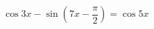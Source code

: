 \begin{ex}[type=equation]
	\begin{condition}
		$\ \cos 3x-\sin {\left(7x -\dfrac{\pi}{2}\right)} = \cos 5x $
	\end{condition}
\end{ex}